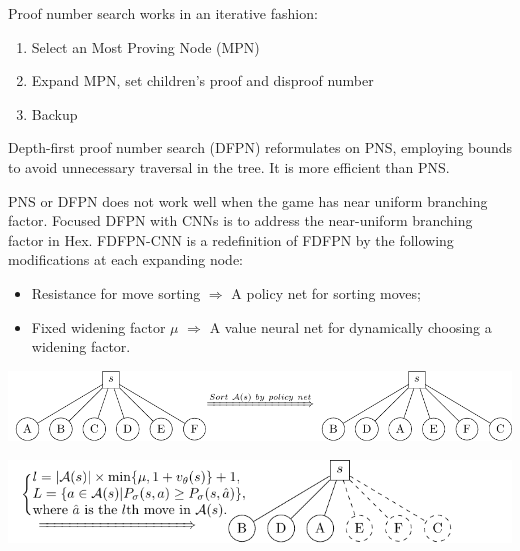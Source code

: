 \documentclass[a0,portrait]{a0poster}
\begin{document}
\begin{multicols}{3}
\vspace{1cm}
Proof number search works in an iterative fashion: 
\begin{enumerate}
\item Select an Most Proving Node (MPN)
\item Expand MPN, set children's proof and disproof number
\item Backup 
\end{enumerate}

Depth-first proof number search (DFPN) reformulates on PNS, employing bounds to avoid unnecessary traversal in the tree. 
It is more efficient than PNS.

PNS or DFPN does not work well when the game has near uniform branching factor. 
Focused DFPN with CNNs is to address the near-uniform branching factor in Hex. FDFPN-CNN is a redefinition of FDFPN by the following modifications at each expanding node:
\begin{itemize}
\item Resistance for move sorting $\Rightarrow$ A policy net for sorting moves;
\item Fixed widening factor $\mu$ $\Rightarrow$ A value neural net for dynamically choosing a widening factor.
\end{itemize}

\begin{center}\vspace{1cm}
\includegraphics[width=0.8\linewidth]{andor1.pdf}
\end{center}%

\begin{center}\vspace{1cm}
\includegraphics[width=0.8\linewidth]{andor2.pdf}
\end{center}%


\end{multicols}
\end{document}
